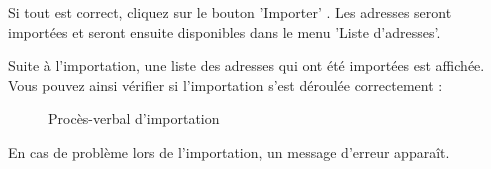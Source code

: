 Si tout est correct, cliquez sur le bouton 'Importer' . Les adresses seront importées et seront ensuite disponibles dans le menu 'Liste d'adresses'.

\vspace{\baselineskip}

Suite à l'importation, une liste des adresses qui ont été importées est affichée. Vous pouvez ainsi vérifier si l'importation s'est déroulée correctement :

\begin{figure}[H]
\caption{Procès-verbal d'importation}
\end{figure}

En cas de problème lors de l'importation, un message d'erreur apparaît.